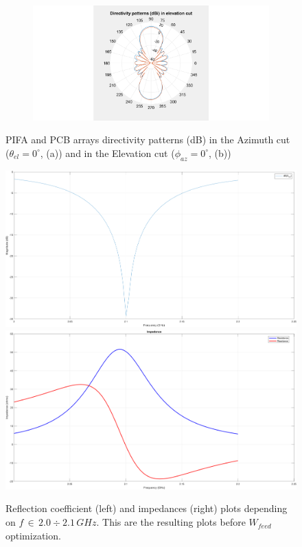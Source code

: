 \documentclass[12pt,a4paper]{article}
\begin{document}
{\begin{figure}[h]
\begin{center}
\begin{subfigure}{0.5\linewidth}
			\includegraphics[scale=0.3]{pifa_pcb_array_elevation_comparison.pdf}
			\caption{}	\end{subfigure}
		\caption{
			PIFA and PCB arrays directivity patterns (dB) in the Azimuth cut  ($\theta_{el}=0^\circ$, (a)) and in the Elevation cut ($\phi_{az}=0^\circ$, (b))}
	\end{center}  
\end{figure}

\begin{center}
	\begin{figure}
		\includegraphics[width = 0.5\linewidth]{gamma.png}
		\includegraphics[width = 0.5\linewidth]{impedances.png}
		\caption{Reflection coefficient (left) and impedances (right) plots depending on $f\,\in\,2.0\div 2.1\,GHz$. This are the resulting plots before $W_{feed}$ optimization. }
	\end{figure}
\end{center}
}
\end{document}
